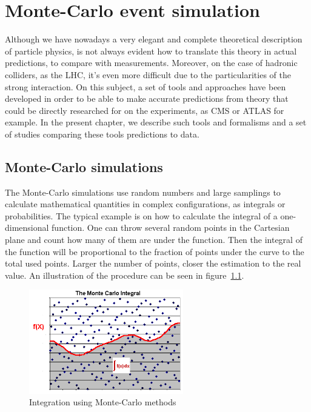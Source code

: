 \chapter[MC event generation]{Monte-Carlo event simulation}
\label{chap:MC}

Although we have nowadays a very elegant and complete theoretical description of particle physics, is not always evident how to translate this theory in actual predictions, to compare with measurements. Moreover, on the case of hadronic colliders, as the LHC, it's even more difficult due to the particularities of the strong interaction. On this subject, a set of tools and approaches have been developed in order to be able to make accurate predictions from theory that could be directly researched for on the experiments, as CMS or ATLAS for example. In the present chapter, we describe such tools and formalisms and a set of studies comparing these tools predictions to data. 

\section{Monte-Carlo simulations}
\label{sec:MC}

The Monte-Carlo simulations use random numbers and large samplings to calculate mathematical quantities in complex configurations, as integrals or probabilities. The typical example is on how to calculate the integral of a one-dimensional function. One can throw several random points in the Cartesian plane and count how many of them are under the function. Then the integral of the function will be proportional to the fraction of points under the curve to the total used points. Larger the number of points, closer the estimation to the real value. An illustration of the procedure can be seen in figure~\ref{fig:mc_int}.

\begin{figure}[!Hhtbp]
  \begin{center}
    \includegraphics[width=0.6\textwidth]{figs/mc_integral.png}
    \caption{Integration using Monte-Carlo methods}
    \label{fig:mc_int}
  \end{center}
\end{figure}

